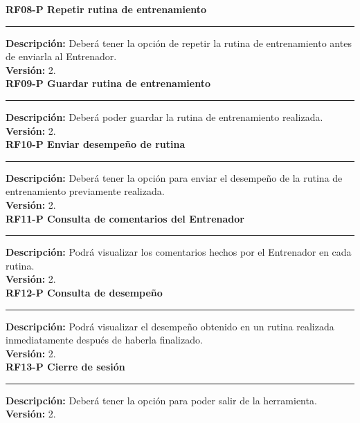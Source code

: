 \textbf{\textcolor[rgb]{0, 0, 0.545098}{RF08-P \hspace{2cm} Repetir rutina de entrenamiento}}\\
\rule[3mm]{17cm}{0.1mm}
\label{rf:RF08-P}
\textbf{Descripción: } Deberá tener la opción de repetir la rutina de entrenamiento antes de enviarla al Entrenador. \\
\textbf{Versión: } 2. \\

\textbf{\textcolor[rgb]{0, 0, 0.545098}{RF09-P \hspace{2cm} Guardar rutina de entrenamiento}}\\
\rule[3mm]{17cm}{0.1mm}
\label{rf:RF09-P}
\textbf{Descripción: } Deberá poder guardar la rutina de entrenamiento realizada. \\
\textbf{Versión: } 2. \\

\textbf{\textcolor[rgb]{0, 0, 0.545098}{RF10-P \hspace{2cm} Enviar desempeño de rutina}}\\
\rule[3mm]{17cm}{0.1mm}
\label{rf:RF10-P}
\textbf{Descripción: } Deberá tener la opción para enviar el desempeño de la rutina de entrenamiento previamente realizada. \\
\textbf{Versión: } 2. \\

\textbf{\textcolor[rgb]{0, 0, 0.545098}{RF11-P \hspace{2cm} Consulta de comentarios del Entrenador}}\\
\rule[3mm]{17cm}{0.1mm}
\label{rf:RF11-P}
\textbf{Descripción: } Podrá visualizar los comentarios hechos por el Entrenador en cada rutina. \\
\textbf{Versión: } 2. \\

\textbf{\textcolor[rgb]{0, 0, 0.545098}{RF12-P \hspace{2cm} Consulta de desempeño}}\\
\rule[3mm]{17cm}{0.1mm}
\label{rf:RF12-P}
\textbf{Descripción: } Podrá visualizar el desempeño obtenido en un rutina realizada inmediatamente después de haberla finalizado. \\
\textbf{Versión: } 2. \\

\textbf{\textcolor[rgb]{0, 0, 0.545098}{RF13-P \hspace{2cm} Cierre de sesión}}\\
\rule[3mm]{17cm}{0.1mm}
\label{rf:RF13-P}
\textbf{Descripción: } Deberá tener la opción para poder salir de la herramienta.  \\
\textbf{Versión: } 2. \\

\clearpage

